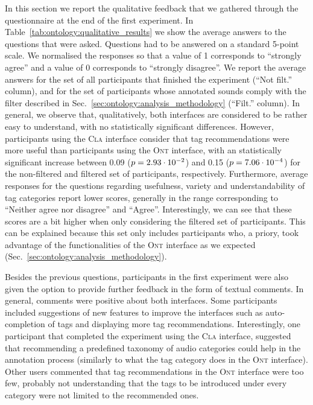 In this section we report the qualitative feedback that we gathered through the questionnaire at the end of the first experiment.
In Table~\ref{tab:ontology:qualitative_results} we show the average answers to the questions that were asked. Questions had to be answered on a standard 5-point scale. We normalised the responses so that a value of 1 corresponds to ``strongly agree'' and a value of 0 corresponds to ``strongly disagree''. 
We report the average answers for the set of all participants that finished the experiment (``Not filt.'' column), and for the set of participants whose annotated sounds comply with the filter described in Sec.~\ref{sec:ontology:analysis_methodology} (``Filt.'' column).
In general, we observe that, qualitatively, both interfaces are considered to be rather easy to understand, with no statistically significant differences. However, participants using the \textsc{Cla} interface consider that tag recommendations were more useful than participants using the \textsc{Ont} interface, with an statistically significant increase between 0.09 ($p = 2.93\cdot 10^{-2}$) and 0.15 ($p = 7.06\cdot 10^{-4}$) for the non-filtered and filtered set of participants, respectively.
Furthermore, average responses for the questions regarding usefulness, variety and understandability of tag categories report lower scores, generally in the range corresponding to ``Neither agree nor disagree'' and ``Agree''.
Interestingly, we can see that these scores are a bit higher when only considering the filtered set of participants. This can be explained because this set only includes participants who, a priory, took advantage of the functionalities of the \textsc{Ont} interface as we expected (Sec.~\ref{sec:ontology:analysis_methodology}).

Besides the previous questions, participants in the first experiment were also given the option to provide further feedback in the form of textual comments.
In general, comments were positive about both interfaces. Some participants included suggestions of new features to improve the interfaces such as auto-completion of tags and displaying more tag recommendations. Interestingly, one participant that completed the experiment using the \textsc{Cla} interface, suggested that recommending a predefined taxonomy of audio categories could help in the annotation process (similarly to what the tag category  does in the \textsc{Ont} interface).
Other users commented that tag recommendations in the \textsc{Ont} interface were too few, probably not understanding that the tags to be introduced under every category were not limited to the recommended ones.

